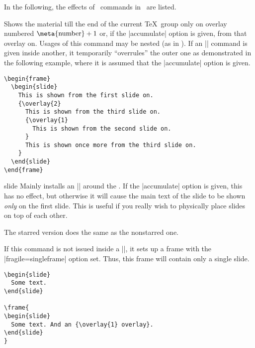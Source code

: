 In the following, the effects of \seminar\ commands in \beamer\ are listed.

\begin{command}{\overlay{}}
  Shows the material till the end of the current \TeX\ group only on overlay numbered $\hbox{\meta{number}}+1$ or, if the |accumulate| option is given, from that overlay on. Usages of this command may be nested (as in \seminar). If an |\overlay| command is given inside another, it temporarily ``overrules'' the outer one as demonstrated in the following example, where it is assumed that the |accumulate| option is given.

  \example
\begin{verbatim}
\begin{frame}
  \begin{slide}
    This is shown from the first slide on.
    {\overlay{2}
      This is shown from the third slide on.
      {\overlay{1}
        This is shown from the second slide on.
      }
      This is shown once more from the third slide on.
    }
  \end{slide}
\end{frame}
\end{verbatim}
\end{command}

\begin{environment}{{slide}\opt{|*|}}
  Mainly installs an || around the . If the |accumulate| option is given, this has no effect, but otherwise it will cause the main text of the slide to be shown \emph{only} on the first slide. This is useful if you really wish to physically place slides on top of each other.

  The starred version does the same as the nonstarred one.

  If this command is not issued inside a |\frame|, it sets up a frame with the |fragile=singleframe| option set. Thus, this frame will contain only a single slide.

  \example
\begin{verbatim}
\begin{slide}
  Some text.
\end{slide}

\frame{
\begin{slide}
  Some text. And an {\overlay{1} overlay}.
\end{slide}
}
\end{verbatim}
\end{environment}

